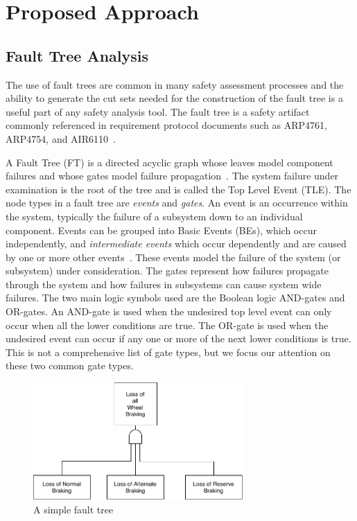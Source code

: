 \chapter{Proposed Approach}
\label{ch:prop}

\section{Fault Tree Analysis} 
The use of fault trees are common in many safety assessment processes and the ability to generate the cut sets needed for the construction of the fault tree is a useful part of any safety analysis tool. The fault tree is a safety artifact commonly referenced in requirement protocol documents such as ARP4761, ARP4754, and AIR6110~\cite{SAE:ARP4761,SAE:ARP4754A,AIR6110}.

A Fault Tree (FT) is a directed acyclic graph whose leaves model component failures and whose gates model failure propagation~\cite{0f356f05e72f43018211b36f97c8854a}. The system failure under examination is the root of the tree and is called the Top Level Event (TLE). The node types in a fault tree are \textit{events} and \textit{gates}. An event is an occurrence within the system, typically the failure of a subsystem down to an individual component. Events can be grouped into Basic Events (BEs), which occur independently, and \textit{intermediate events} which occur dependently and are caused by one or more other events~\cite{historyFTA}.  These events model the failure of the system (or subsystem) under consideration. The gates represent how failures propagate through the system and how failures in subsystems can cause system wide failures. The two main logic symbols used are the Boolean logic AND-gates and OR-gates. An AND-gate is used when the undesired top level event can only occur when all the lower conditions are true. The OR-gate is used when the undesired event can occur if any one or more of the next lower conditions is true. This is not a comprehensive list of gate types, but we focus our attention on these two common gate types. 
\begin{figure}[h]
\begin{center}
\includegraphics[width=8cm]{images/introFT2.pdf}
\caption{A simple fault tree} \label{fig:introFT}
\end{center}
\end{figure}

